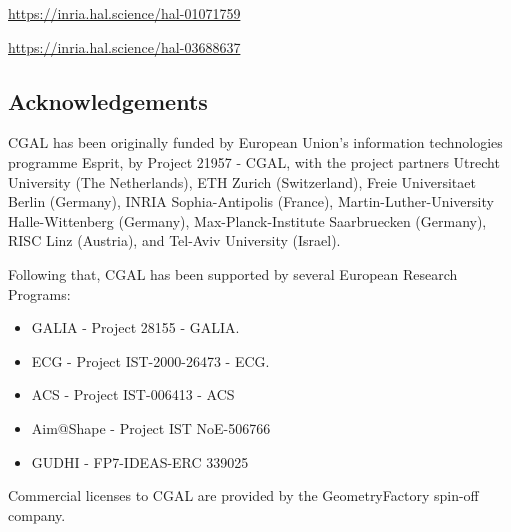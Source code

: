 

\url{https://inria.hal.science/hal-01071759}

\url{https://inria.hal.science/hal-03688637}


\subsection{Acknowledgements}
\label{sec::CGAL:acknowledgements}

%
%



CGAL has been originally funded by European Union's information technologies programme Esprit, by Project 21957 - CGAL, 
with the project partners Utrecht University (The Netherlands), ETH Zurich (Switzerland), Freie Universitaet Berlin (Germany), 
INRIA Sophia-Antipolis (France), Martin-Luther-University Halle-Wittenberg (Germany), Max-Planck-Institute Saarbruecken (Germany), 
RISC Linz (Austria), and Tel-Aviv University (Israel).

Following that, CGAL has been supported by several European Research Programs:
\begin{itemize}
\item GALIA - Project 28155 - GALIA.
\item ECG -  Project IST-2000-26473 - ECG.
\item ACS - Project IST-006413 - ACS
\item Aim@Shape - Project IST NoE-506766
\item GUDHI - FP7-IDEAS-ERC 339025
\end{itemize}

Commercial licenses to CGAL are provided by the GeometryFactory spin-off company.



